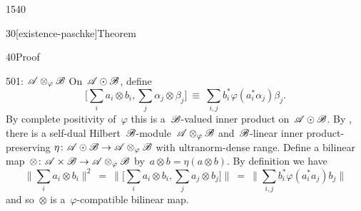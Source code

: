 \begin{parsec}{1540}
\begin{point}{30}[existence-paschke]{Theorem}
\begin{point}{40}{Proof}
\begin{point}{50}{1: $\mathscr{A} \otimes_\varphi \mathscr{B}$}
On~$\mathscr{A} \odot \mathscr{B}$, define
\begin{equation*}
    \bigl[\sum_i a_i \otimes b_i, \sum_j \alpha_j \otimes \beta_j\bigr]
    \ \equiv\  \sum_{i,j} b_i^* \varphi(a_i^*\alpha_j)\beta_j.
\end{equation*}
By complete positivity of~$\varphi$
this is a~$\mathscr{B}$-valued inner product on~$\mathscr{A} \odot \mathscr{B}$.
By ,
    there is a self-dual Hilbert~$\mathscr{B}$-module~$\mathscr{A}\otimes_\varphi \mathscr{B}$
    and~$\mathscr{B}$-linear inner product-preserving
    $\eta\colon \mathscr{A} \odot \mathscr{B} \to \mathscr{A} \otimes_\varphi \mathscr{B}$
    with ultranorm-dense range.
Define a bilinear map~$\otimes \colon \mathscr{A} \times \mathscr{B} \to \mathscr{A} \otimes_\varphi \mathscr{B}$
    by~$a \otimes b = \eta(a \otimes b)$.
By definition we have
\begin{equation*}
\bigl\| \sum_i a_i \otimes b_i \bigr\|^2
    \ =\  \bigl\|\bigl[ \sum_i a_i\otimes b_i, \sum_j a_j \otimes b_j \bigr]\bigr\|
    \ =\  \bigl\|\sum_{i,j} b_i^* \varphi(a_i^*a_j) b_j\bigr\|
\end{equation*}
and so~$\otimes$ is a~$\varphi$-compatible bilinear map.


\end{point}
\end{point}
\end{point}
\end{parsec}
